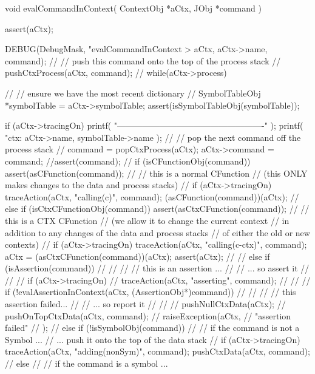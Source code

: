 \startCCode
void evalCommandInContext(
  ContextObj *aCtx,
  JObj       *command
) {
  assert(aCtx);
  
  DEBUG(DebugMask, "evalCommandInContext > %
    aCtx, aCtx->name, command);
  //
  // push this command onto the top of the process stack
  //
  pushCtxProcess(aCtx, command);
  //
  while(aCtx->process) {
    //
    // ensure we have the most recent dictionary
    //
    SymbolTableObj *symbolTable = aCtx->symbolTable;
    assert(isSymbolTableObj(symbolTable));
    
    if (aCtx->tracingOn) {
      printf(
        "\n----------------------------------------------------\n"
      );
      printf(
        "ctx: %
        aCtx->name, symbolTable->name
      );
    }
    //
    // pop the next command off the process stack
    //
    command = popCtxProcess(aCtx);
    aCtx->command = command;
    //assert(command);
    //
    if (isCFunctionObj(command)) {
      assert(asCFunction(command));
      //
      // this is a normal CFunction
      // (this ONLY makes changes to the data and process stacks)
      //
      if (aCtx->tracingOn)
        traceAction(aCtx, "calling(c)", command);
      (asCFunction(command))(aCtx);
      //
    } else if (isCtxCFunctionObj(command)) {
        assert(asCtxCFunction(command));
        //
        // this is a CTX CFunction
        // (we allow it to change the current context
        //  in addition to any changes of the data and process stacks
        //  of either the old or new contexts)
        //
        if (aCtx->tracingOn) 
          traceAction(aCtx, "calling(c-ctx)", command);
        aCtx = (asCtxCFunction(command))(aCtx);
        assert(aCtx);
        //    
//    } else if (isAssertion(command)) {
//      //
//      // this is an assertion ...
//      //   ... so assert it 
//      //
//      if (aCtx->tracingOn) 
//        traceAction(aCtx, "asserting", command);
//      //
//      if (!evalAssertionInContext(aCtx, (AssertionObj*)command)) {
//        //
//        // this assertion failed... 
//        //   ... so report it
//        //
//        pushNullCtxData(aCtx);
//        pushOnTopCtxData(aCtx, command);
//        raiseException(aCtx,
//          "assertion failed"
//        );
//      }
    } else if (!isSymbolObj(command)) {
      //
      // if the command is not a Symbol ...
      //  ...  push it onto the top of the data stack
      //
      if (aCtx->tracingOn)
        traceAction(aCtx, "adding(nonSym)", command);
      pushCtxData(aCtx, command);
      //
   } else {
      //
      // if the command is a symbol ...
}}}
